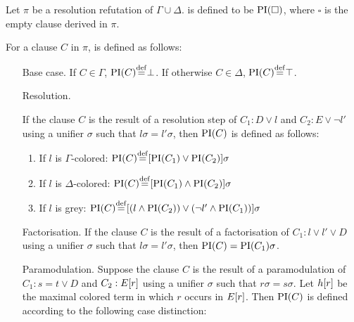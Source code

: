 \begin{defi}
	Let $\pi$ be a resolution refutation of $\Gamma \cup \Delta$.
	 is defined to be $\operatorname{PI}(\square)$, where $\square$ is the empty clause derived in $\pi$.

	For a clause $C$ in $\pi$,  is defined as follows:
	\label{def:PI}
	\begin{itemize}
		\item[Base case.]
			If $C \in \Gamma$, $\PI(C) \defeq \bot$.
			If otherwise $C \in \Delta$, $\PI(C) \defeq \top$.
		\item[Resolution.]
			\label{def:PI_resolution}

			If the clause $C$ is the result of a resolution step of $C_1: D \lor l$ and $C_2: E \lor \lnot l'$ using a unifier $\sigma$ such that $l\sigma = l'\sigma$, then $\operatorname{PI}(C)$ is defined as follows:
			\begin{enumerate}
				\item If $l$ is $\Gamma$-colored: $\PI(C) \defeq{} [\PI(C_1) \lor \PI(C_2)]\sigma$
				\item If $l$ is $\Delta$-colored: $\PI(C) \defeq{} [\PI(C_1) \land \PI(C_2)]\sigma$
				\item If $l$ is grey: $\PI(C) \defeq{} [(l \land \PI(C_2)) \lor (\lnot l' \land \PI(C_1)) ]\sigma $
			\end{enumerate}

		\item[Factorisation.]
			If the clause $C$ is the result of a factorisation of $C_1: l \lor l' \lor D$ using a unifier $\sigma$ such that $l\sigma = l'\sigma$, then $\operatorname{PI}(C) = \operatorname{PI}(C_1)\sigma$.

		\item[Paramodulation.]
			\label{def:PI_paramod}
			Suppose the clause $C$ is the result of a paramodulation of $C_1: s=t \lor D$ and $C_2: E[r]$ using a       unifier $\sigma$ such that $r\sigma = s\sigma$.
			Let $h[r]$ be the maximal colored term in which $r$ occurs in $E[r]$.
			Then $\operatorname{PI}(C)$ is defined according to the following case distinction:
			\begin{enumerate}


\end{enumerate}
\end{itemize}
\end{defi}

